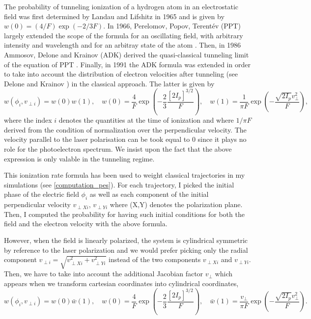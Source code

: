 \documentclass[a4paper]{article}
\begin{document}
The probability of tunneling ionization of a hydrogen atom in an electrostatic field was first determined by Landau and Lifshitz in 1965 \cite{Landau_1965} and is given by $w(0)=(4/F)\exp(-2/3F)$. In 1966, Perelomov, Popov, Terent\'ev (PPT) largely extended the scope of the formula for an oscillating field, with arbitrary intensity and wavelength and for an arbitray state of the atom \cite{PPT_1966}. Then, in 1986 Ammosov, Delone and Krainov (ADK) derived the quasi-classical tunneling limit of the equation of PPT \cite{ADK_1986}. Finally, in 1991 the ADK formula was extended in order to take into account the distribution of electron velocities after tunneling (see Delone and Krainov \cite{Delone_1991}) in the classical approach. The latter is given by
\begin{equation} 
\label{ADK_distribution}
w(\phi_{i},v_{\perp i})=w(0)w(1), \quad w(0)=\frac{4}{F}\exp(-\frac{2}{3}\frac{[2I_{p}]^{3/2}}{F}), \quad w(1)=\frac{1}{\pi F}\exp(-\frac{\sqrt{2I_{p}}v_{\perp}^{2}}{F}),
\end{equation}
where the index $i$ denotes the quantities at the time of ionization and where $1/\pi F$ derived from the condition of normalization over the perpendicular velocity. 
The velocity parallel to the laser polarisation can be took equal to 0 since it plays no role for the photoelectron spectrum. We insist upon the fact that the above expression is only valable in the tunneling regime.
\par
This ionization rate formula has been used to weight classical trajectories in my simulations (see \ref{computation_pes}). For each trajectory, I picked the initial phase of the electric field $\phi_{i}$ as well as each component of the initial perpendicular velocity $v_{\perp X i}$, $v_{\perp Y i}$ where (X,Y) denotes the polarization plane. Then, I computed the probability for having such initial conditions for both the field and the electron velocity with the above formula.
\par
However, when the field is linearly polarized, the system is cylindrical symmetric by reference to the laser polarization and we would prefer picking only the radial component $v_{\perp i}=\sqrt{v_{\perp X i}^{2} + v_{\perp Y i}^{2}}$ instead of the two components $v_{\perp X i}$ and $v_{\perp Y i}$. Then, we have to take into account the additional Jacobian factor $v_{\perp}$ which appears when we transform cartesian coordinates into cylindrical coordinates,
\begin{equation}
w(\phi_{i},v_{\perp i})=w(0)\bar w(1), \quad w(0)=\frac{4}{F}\exp(-\frac{2}{3}\frac{[2I_{p}]^{3/2}}{F}), \quad \bar w(1)=\frac{v_{\perp}}{\pi F}\exp(-\frac{\sqrt{2I_{p}}v_{\perp}^{2}}{F}).
\end{equation}
\end{document}
